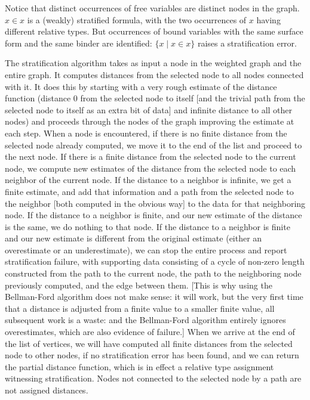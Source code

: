 \documentclass[12pt]{article}
\begin{document}
Notice that distinct occurrences of free variables are distinct
nodes in the graph. $x \in x$ is a (weakly) stratified formula,
with the two occurrences of $x$ having different relative types.
But occurrences of bound
variables with the same surface form and the same binder are identified: $\{x
\mid x \in x\}$ raises a stratification error.

The stratification algorithm takes as input a node in the
weighted graph and the entire graph. It computes distances from
the selected node to all nodes connected with it. It does this
by starting with a very rough estimate of the distance function
(distance 0 from the selected node to itself [and the trivial
path from the selected node to itself as an extra bit of data]
and infinite distance to all other nodes) and proceeds through
the nodes of the graph improving the estimate at each step. When
a node is encountered, if
there is no finite distance from the selected node already
computed, we move it to the end of the list and proceed to the
next node. If there is a finite distance from the selected node
to the current node, we compute new estimates of the distance
from the selected node to each neighbor of the current node. If
the distance to a neighbor is infinite, we get a finite
estimate, and add that information and a path from the selected
node to the neighbor [both computed in the obvious way] to the
data for that neighboring node. If the distance to a neighbor is
finite, and our new estimate of the distance is the same, we do
nothing to that node. If the distance to a neighbor is finite
and our new estimate is different from the original estimate
(either an overestimate or an underestimate), we can stop the
entire process and report stratification failure, with
supporting data consisting of a cycle of non-zero length constructed from the path to the current node, the
path to the neighboring node previously computed, and the edge
between them. [This is why using the Bellman-Ford algorithm does
not make sense: it will work, but the very first time that a
distance is adjusted from a finite value to a smaller finite
value, all subsequent work is a waste: and the Bellman-Ford
algorithm entirely ignores overestimates, which are also
evidence of failure.] When we arrive at the end of the list of
vertices, we will have computed all finite distances from the
selected node to other nodes, if no stratification error has
been found,
and we can return the partial distance function, which is in
effect a relative type assignment witnessing stratification.
Nodes not connected to the selected node by a path are not
assigned distances.
\end{document}
